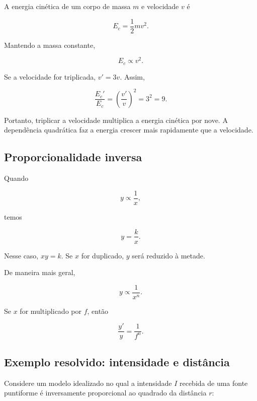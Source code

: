A energia cinética de um corpo de massa $m$ e velocidade $v$ é

\begin{equation}
  E_c=\frac{1}{2}mv^2.
\end{equation}

Mantendo a massa constante,

\begin{equation}
  E_c\propto v^2.
\end{equation}

Se a velocidade for triplicada, $v'=3v$. Assim,

\begin{equation}
  \frac{E_c'}{E_c}
  =\left(\frac{v'}{v}\right)^2
  =3^2
  =9.
\end{equation}

Portanto, triplicar a velocidade multiplica a energia cinética por nove. A dependência quadrática faz a energia crescer mais rapidamente que a velocidade.

\subsection{Proporcionalidade inversa}

Quando

\begin{equation}
  y\propto\frac{1}{x},
\end{equation}

temos

\begin{equation}
  y=\frac{k}{x}.
\end{equation}

Nesse caso, $xy=k$. Se $x$ for duplicado, $y$ será reduzido à metade.

De maneira mais geral,

\begin{equation}
  y\propto\frac{1}{x^n}.
\end{equation}

Se $x$ for multiplicado por $f$, então

\begin{equation}
  \frac{y'}{y}=\frac{1}{f^n}.
\end{equation}

\subsection*{Exemplo resolvido: intensidade e distância}

Considere um modelo idealizado no qual a intensidade $I$ recebida de uma fonte puntiforme é inversamente proporcional ao quadrado da distância $r$:

